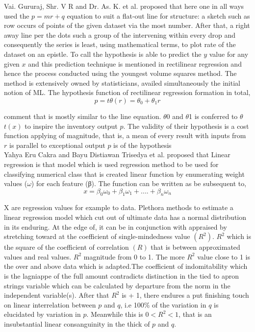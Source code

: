Vai. Gururaj, Shr. V R and Dr. As. K. \cite{peng2019analysis} et al. proposed that here one in all ways used the $p = mr + q$ equation to suit a flat-out line for structure: a sketch such as row occurs of points of the given dataset via the most number. After that, a right away line per the dots such a group of the intervening within every drop and consequently the series is least, using mathematical terms, to plot rate of the dataset on an epistle. To call the hypothesis is able to predict the $y$ value for any given $x$ and this prediction technique is mentioned in rectilinear regression and hence the process conducted using the youngest volume squares method. The method is extensively owned by statisticians, availed simultaneously the initial notion of ML. The hypothesis function of rectilinear regression formation in total,\\

\begin{equation}
     p = t\theta(r) = \theta_0+\theta_1r 
\end{equation}

comment that is mostly similar to the line equation. $\theta$0 and $\theta$1 is conferred to $\theta$ $t(x)$ to inspire the inventory output $p$. The validity of their hypothesis is a cost function applying of magnitude, that is, a mean of every result with inputs from $r$ is parallel to exceptional output $p$ is of the hypothesis \\

Yahya Eru Cakra and Bayu Distiawan Trisedya \cite{cakra2015stock} et al. proposed that Linear regression is that model which is used regression method to be used for classifying numerical class that is created linear function by enumerating weight values ($\omega$) for each feature (β). The function can be written as be subsequent to,\\

\begin{equation}
     x = \beta_0\omega_0+\beta_1\omega_1+... .+\beta_n\omega_n
\end{equation}

 X are regression values for example to data. Plethora methods to estimate a linear regression model which cut out of ultimate data has a normal distribution in its enduring. At the edge of, it can be in conjunction with appraised by stretching toward at the coefficient of single-mindedness value $(R^2)$. $R^2$ which is the square of the coefficient of correlation $(R)$ that is between approximated values and real values. $R^2$ magnitude from 0 to 1. The more $R^2$ value close to 1 is the over and above data which is adapted.The coefficient of indomitability which is the lagniappe of the full amount contradicts distinction in the tied to apron strings variable which can be calculated by departure from the norm in the independent variable(s). After that $R^2$ is + 1, there endures a put finishing touch on linear interrelation between $p$ and $q$, i.e 100\% of the variation in $q$ is elucidated by variation in $p$. Meanwhile this is $0< R^2 <1$, that is an insubstantial linear consanguinity in the thick of $p$ and $q$. \\
 
